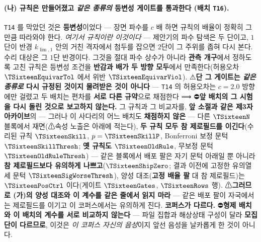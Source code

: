 \documentclass[11pt]{report}
\numberwithin{equation}{chapter}
\numberwithin{figure}{chapter}
\numberwithin{table}{chapter}
\begin{document}
\paragraph{(나) 규칙은 만들어졌고 \emph{같은 종류의} 등변성 게이트를 통과한다 (배치 \texttt{T16}).}
\texttt{T14} 를 막았던 것은 \textbf{등변성}이었다 --- 장면 파수를 $c$ 배 하면 규칙의
배율이 정확히 그만큼 따라와야 한다. \emph{여기서 규칙이란 이것이다} --- 제안기의 파수
탐색은 두 단이고, $1$단이 반경 $k_{\lim,1}$ 안의 거친 격자에서 첨두를 잡으면 $2$단이 그
주위를 좁혀 다시 본다. 수리 대상은 그 $1$단 반경이다. 그것을 절대 파수 상수가 아니라
\textbf{관측 개구}에서 정하도록 고친 규칙은 등변성 조건을 \textbf{반감과 배가 두 방향
모두}에서 만족한다(허용오차 $\TSixteenEquivarTol$ 에서 위반 $\TSixteenEquivarViol$).
⚠\textbf{단 그 게이트는 \emph{같은 종류로} 다시 규정된 것이지 물려받은 것이 아니다} ---
\texttt{T14} 의 허용오차는 $c = 2.0$ 방향에만 걸렸고 두 배치는 편차를 \textbf{서로 다른
규약}으로 채점한다 ⟹ ⛔\textbf{앞 배치의 그 시험을 다시 돌린 것으로 보고하지 않는다.}
그 규칙과 그 비교자를, \textbf{앞 소절과 같은 제3자 아카이브}의 --- 그러나 이 사다리의
어느 배치도 \textbf{채점하지 않은} --- 다른 $\TSixteenN$ 블록에서 재면(⚠속성 노출은
아래에 적는다), \textbf{두 규칙 모두 참 제로필드를 이긴다}(수리된 규칙 $\TSixteenSkill$,
$p = \TSixteenSkillP$, Bonferroni 보정 문턱 $\TSixteenSkillThresh$; \textbf{옛 규칙도
$\TSixteenOldRule$}, 무보정 문턱 $\TSixteenOldRuleThresh$) --- 같은 블록에서 배포 팔은
자기 문턱 아래일 뿐 아니라 \textbf{참 제로필드보다 유의하게 나쁘고}($\TSixteenShipZero$;
결과 이전에 고정한 유의열세 문턱 $\TSixteenSigWorseThresh$), 양성 대조(\textbf{고정 배율
팔} 대 참 제로필드)는 $\TSixteenPosCtrl$ 이다(게이트 $\TSixteenGates$, $\TSixteenRows$ 행).
⚠\textbf{그러므로 (가)의 양성 대조와 이 계수를 같은 줄에서 읽지 마라} --- 같은 배포 팔이
자국에서는 제로필드를 이기고 이 코퍼스에서는 유의하게 진다. \textbf{코퍼스가 다르다.} ⛔\textbf{형제 배치와 이 배치의 계수를 서로
비교하지 않는다} --- 파일 집합과 해상상태 구성이 달라 \textbf{모집단이 다르므로}, 이것은
\emph{이 코퍼스 자신의 음성}이지 앞선 음성을 날카롭게 한 것이 아니다.
\end{document}
